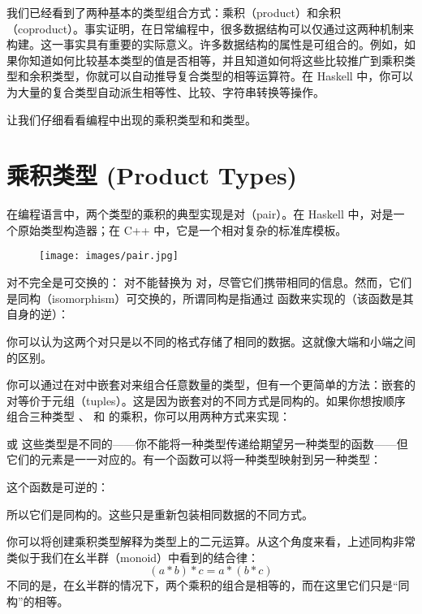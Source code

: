
\lettrine[lhang=0.17]{我}{们已经看到了两种基本}的类型组合方式：乘积（product）和余积（coproduct）。事实证明，在日常编程中，很多数据结构可以仅通过这两种机制来构建。这一事实具有重要的实际意义。许多数据结构的属性是可组合的。例如，如果你知道如何比较基本类型的值是否相等，并且知道如何将这些比较推广到乘积类型和余积类型，你就可以自动推导复合类型的相等运算符。在 Haskell 中，你可以为大量的复合类型自动派生相等性、比较、字符串转换等操作。

让我们仔细看看编程中出现的乘积类型和和类型。

\section{乘积类型 (Product Types)}

在编程语言中，两个类型的乘积的典型实现是对（pair）。在 Haskell 中，对是一个原始类型构造器；在 C++ 中，它是一个相对复杂的标准库模板。

\begin{figure}[H]
  \centering
  \texttt{[image: images/pair.jpg]}
\end{figure}

\noindent
对不完全是可交换的： 对不能替换为  对，尽管它们携带相同的信息。然而，它们是同构（isomorphism）可交换的，所谓同构是指通过  函数来实现的（该函数是其自身的逆）：

你可以认为这两个对只是以不同的格式存储了相同的数据。这就像大端和小端之间的区别。

你可以通过在对中嵌套对来组合任意数量的类型，但有一个更简单的方法：嵌套的对等价于元组（tuples）。这是因为嵌套对的不同方式是同构的。如果你想按顺序组合三种类型 、 和  的乘积，你可以用两种方式来实现：


或
这些类型是不同的——你不能将一种类型传递给期望另一种类型的函数——但它们的元素是一一对应的。有一个函数可以将一种类型映射到另一种类型：

这个函数是可逆的：

所以它们是同构的。这些只是重新包装相同数据的不同方式。

你可以将创建乘积类型解释为类型上的二元运算。从这个角度来看，上述同构非常类似于我们在幺半群（monoid）中看到的结合律：
\[
  (a * b) * c = a * (b * c)
\]
不同的是，在幺半群的情况下，两个乘积的组合是相等的，而在这里它们只是“同构”的相等。

